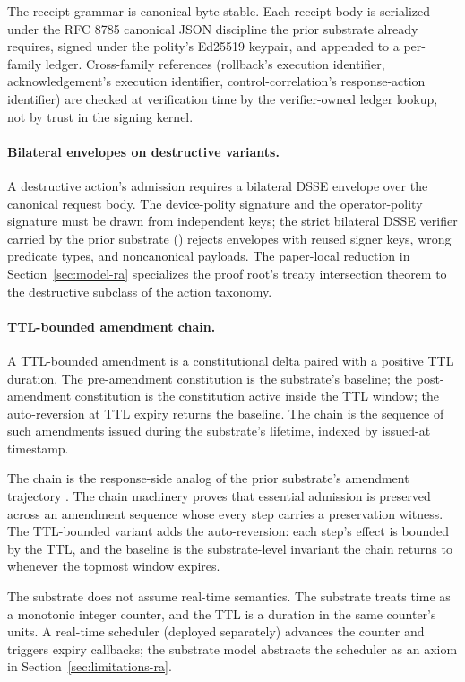 The receipt grammar is canonical-byte stable. Each receipt body is
serialized under the RFC 8785 canonical JSON discipline the prior
substrate \cite{programmableSovereigntyAnonymous} already requires,
signed under the polity's Ed25519 keypair, and appended to a per-family
ledger. Cross-family references
(rollback's execution identifier, acknowledgement's execution
identifier, control-correlation's response-action identifier) are
checked at verification time by the verifier-owned ledger lookup, not
by trust in the signing kernel.

\paragraph{Bilateral envelopes on destructive variants.}
A destructive action's admission requires a bilateral DSSE envelope
over the canonical request body. The device-polity signature and the
operator-polity signature must be drawn from independent keys; the
strict bilateral DSSE verifier carried by the prior substrate
\cite{programmableSovereigntyAnonymous}
() rejects
envelopes with reused signer keys, wrong predicate types, and
noncanonical payloads. The paper-local reduction
in Section~\ref{sec:model-ra} specializes the proof root's treaty
intersection theorem to the destructive subclass of the action
taxonomy.

\paragraph{TTL-bounded amendment chain.}
A TTL-bounded amendment is a constitutional delta paired with a
positive TTL duration. The pre-amendment constitution is the
substrate's baseline; the post-amendment constitution is the
constitution active inside the TTL window; the auto-reversion at TTL
expiry returns the baseline. The chain is the sequence of such
amendments issued during the substrate's lifetime, indexed by
issued-at timestamp.

The chain is the response-side analog of the prior substrate's
amendment trajectory \cite{programmableSovereigntyAnonymous}. The chain
machinery  proves that essential
admission is preserved across an amendment sequence whose every step
carries a preservation witness. The TTL-bounded variant adds the auto-reversion:
each step's effect is bounded by the TTL, and the baseline is the
substrate-level invariant the chain returns to whenever the topmost
window expires.

The substrate does not assume real-time semantics. The substrate
treats time as a monotonic integer counter, and the TTL is a duration
in the same counter's units. A real-time scheduler (deployed
separately) advances the counter and triggers expiry callbacks; the
substrate model abstracts the scheduler as an axiom in
Section~\ref{sec:limitations-ra}.
